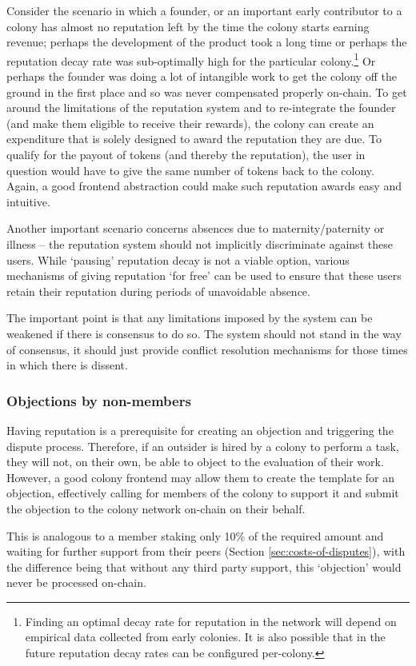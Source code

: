 Consider the scenario in which a founder, or an important early contributor to a colony has almost no reputation left by the time the colony starts earning revenue; perhaps the development of the product took a long time or perhaps the reputation decay rate was sub-optimally high for the particular colony.\footnote{Finding an optimal decay rate for reputation in the network will depend on empirical data collected from early colonies. It is also possible that in the future reputation decay rates can be configured per-colony.} Or perhaps the founder was doing a lot of intangible work to get the colony off the ground in the first place and so was never compensated properly on-chain. To get around the limitations of the reputation system and to re-integrate the founder (and make them eligible to receive their rewards), the colony can create an expenditure that is solely designed to award the reputation they are due. To qualify for the payout of tokens (and thereby the reputation), the user in question would have to give the same number of tokens back to the colony. Again, a good frontend abstraction could make such reputation awards easy and intuitive.

Another important scenario concerns absences due to maternity/paternity or illness -- the reputation system should not implicitly discriminate against these users. While `pausing' reputation decay is not a viable option, various mechanisms of giving reputation `for free' can be used to ensure that these users retain their reputation during periods of unavoidable absence.

The important point is that any limitations imposed by the system can be weakened if there is consensus to do so. The system should not stand in the way of consensus, it should just provide conflict resolution mechanisms for those times in which there is dissent.

\subsubsection{Objections by non-members}

Having reputation is a prerequisite for creating an objection and triggering the dispute process. Therefore, if an outsider is hired by a colony to perform a task, they will not, on their own, be able to object to the evaluation of their work. However, a good colony frontend may allow them to create the template for an objection, effectively calling for members of the colony to support it and submit the objection to the colony network on-chain on their behalf.

This is analogous to a member staking only 10\% of the required amount and waiting for further support from their peers (Section \ref{sec:costs-of-disputes}), with the difference being that without any third party support, this `objection' would never be processed on-chain.

